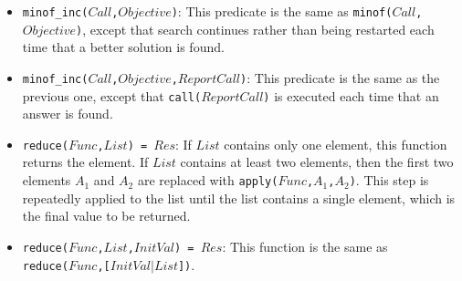 \begin{itemize}
\item \texttt{minof\_inc($Call$,$Objective$)}: This predicate is the same as \texttt{minof($Call$,$Objective$)}, except that search continues rather than being restarted each time that a better solution is found.
\item \texttt{minof\_inc($Call$,$Objective$,$ReportCall$)}: This predicate is the same as the previous one, except that \texttt{call($ReportCall$)} is executed each time that an answer is found.
\item \texttt{reduce($Func$,$List$) = $Res$}: If $List$ contains only one element, this function returns the element. If $List$ contains at least two elements, then the first two elements $A_1$ and $A_2$ are replaced with \texttt{apply($Func$,$A_1$,$A_2$)}. This step is repeatedly applied to the list until the list contains a single element, which is the final value to be returned.
\item \texttt{reduce($Func$,$List$,$InitVal$) = $Res$}: This function is the same as\\
 \texttt{reduce($Func$,[$InitVal$$|$$List$])}.
\end{itemize}


